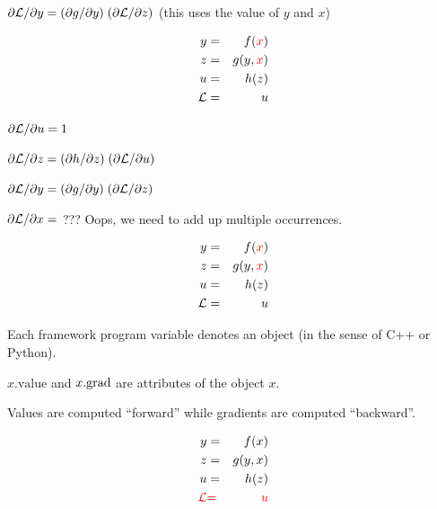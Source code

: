 {\medskip
{\color{red} ${\partial {\cal L}}/{\partial y} = ({\partial g}/{\partial y}) \; ({\partial {\cal L}}/{\partial z})$} (this uses the value of $y$ and $x$)

\vspace{-3ex}
\begin{eqnarray*}
  y & = & f({\color{red} x}) \\
  z & = & g(y,{\color{red} x}) \\
  u & = & h(z) \\
  {\cal L} &  = &  u
\end{eqnarray*}

\medskip
${\partial {\cal L}}/{\partial u} = 1$

\medskip
${\partial {\cal L}}/{\partial z} = ({\partial h}/{\partial z}) \;({\partial {\cal L}}/{\partial u})$

\medskip
${\partial {\cal L}}/{\partial y} = ({\partial g}/{\partial y}) \;({\partial {\cal L}}/{\partial z})$

\medskip
{\color{red} ${\partial {\cal L}}/{\partial x} =$ ???} Oops, we need to add up multiple occurrences.

\vspace{-3ex}
\begin{eqnarray*}
  y & = & f({\color{red} x}) \\
  z & = & g(y,{\color{red} x}) \\
  u & = & h(z) \\
  {\cal L} &  = &  u
\end{eqnarray*}

\medskip
Each framework program variable denotes an {\color{red} object} (in the sense of C++ or Python).

\medskip
{\color{red} $x.\mathrm{value}$} and {\color{red} $x.\mathrm{grad}$} are attributes of the {\color{red} object $x$}.

\bigskip
Values are computed ``forward'' while gradients are computed ``backward''.


\vspace{-3ex}
\begin{eqnarray*}
  y & = & f(x) \\
  z & = & g(y,x) \\
  u & = & h(z) \\
  {\color{red} {\cal L}} &  {\color{red} =} & {\color{red}  u}
\end{eqnarray*}


}

